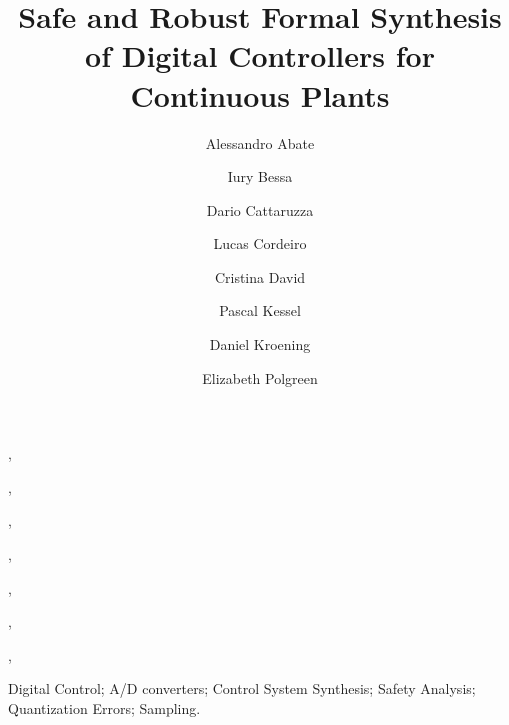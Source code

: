 \documentclass[twocolumn]{autart}    %
\begin{document}
\newcommand\tool{{\sf DSSynth}}
\begin{frontmatter}



\title{Safe and Robust Formal Synthesis of Digital Controllers for Continuous Plants}


\author[oxford]{Alessandro Abate},
\author[manaus]{Iury Bessa},
\author[oxford]{Dario Cattaruzza},
\author[oxford,manaus]{Lucas Cordeiro},
\author[cambridge]{Cristina David},
\author[oxford]{Pascal Kessel},
\author[oxford]{Daniel Kroening},
\author[oxford]{Elizabeth Polgreen}

\address[oxford]{University of Oxford, UK}
\address[cambridge]{University of Cambridge, UK}
\address[manaus]{Federal University of Amazonas, Brazil}



          
\begin{keyword}                           %
Digital Control; A/D converters; Control System Synthesis; Safety Analysis; Quantization Errors; Sampling.               %
\end{keyword}                             %


\end{frontmatter}
\end{document}
